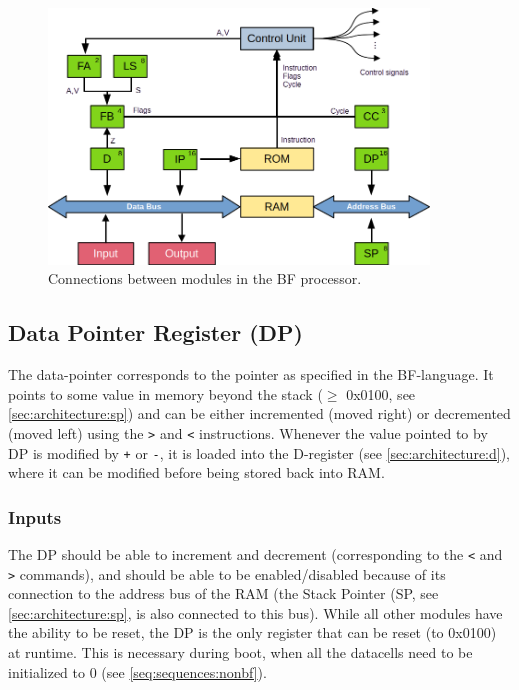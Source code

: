 \begin{figure}[H]
  \centering
  \includegraphics[width=0.9\textwidth]{img/bfcpu_architecture}
  \caption{Connections between modules in the BF processor.}
  \label{fig:architecture}
\end{figure}


\subsection{Data Pointer Register (DP)} \label{sec:architecture:dp}
The data-pointer corresponds to the pointer as specified in the BF-language. It points to some value in memory beyond the stack ($\ge$ 0x0100, see \ref{sec:architecture:sp}) and can be either incremented (moved right) or decremented (moved left) using the \texttt{>} and \texttt{<} instructions. Whenever the value pointed to by DP is modified by \texttt{+} or \texttt{-}, it is loaded into the D-register (see \ref{sec:architecture:d}), where it can be modified before being stored back into RAM.

\subsubsection*{Inputs}
The DP should be able to increment and decrement (corresponding to the \texttt{<} and \texttt{>} commands), and should be able to be enabled/disabled because of its connection to the address bus of the RAM (the Stack Pointer (SP, see \ref{sec:architecture:sp}, is also connected to this bus). While all other modules have the ability to be reset, the DP is the only register that can be reset (to 0x0100) at runtime. This is necessary during boot, when all the datacells need to be initialized to 0 (see \ref{seq:sequences:nonbf}).

